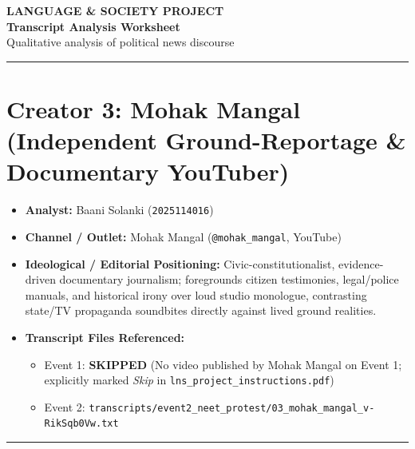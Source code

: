 \documentclass[10pt,a4paper]{article}
\begin{document}
\clearpage

\begin{center}
    {\large\bfseries LANGUAGE \& SOCIETY PROJECT}\\[3pt]
    {\LARGE\bfseries Transcript Analysis Worksheet}\\[3pt]
    {\normalsize Qualitative analysis of political news discourse}
\end{center}
\vspace{2pt}
\noindent\rule{\textwidth}{0.4pt}
\vspace{4pt}


\section*{Creator 3: Mohak Mangal (Independent Ground-Reportage \& Documentary YouTuber)}
\begin{itemize}[leftmargin=1.5em, itemsep=3pt, topsep=4pt]
  \item \textbf{Analyst:} Baani Solanki (\texttt{2025114016})
  \item \textbf{Channel / Outlet:} Mohak Mangal (\texttt{@mohak\_mangal}, YouTube)
  \item \textbf{Ideological / Editorial Positioning:} Civic-constitutionalist, evidence-driven documentary journalism; foregrounds citizen testimonies, legal/police manuals, and historical irony over loud studio monologue, contrasting state/TV propaganda soundbites directly against lived ground realities.
  \item \textbf{Transcript Files Referenced:}
  \begin{itemize}[leftmargin=1.4em, itemsep=2pt, topsep=2pt]
    \item Event 1: \textbf{SKIPPED} (No video published by Mohak Mangal on Event 1; explicitly marked \textit{Skip} in \texttt{lns\_project\_instructions.pdf})
    \item Event 2: \texttt{transcripts/event2\_neet\_protest/03\_mohak\_mangal\_v-RikSqb0Vw.txt}
  \end{itemize}
\end{itemize}
\vspace{4pt}\noindent\rule{\textwidth}{0.4pt}\vspace{4pt}
\end{document}
